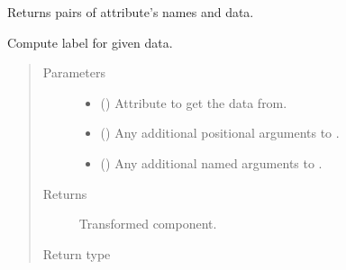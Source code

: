 \documentclass[letterpaper,10pt,english]{sphinxmanual}
\begin{document}
\begin{fulllineitems}
\begin{fulllineitems}
\end{fulllineitems}


\begin{fulllineitems}
\label{\detokenize{api/rock:geology.src.Rock.items}}
Returns pairs of attribute’s names and data.

\end{fulllineitems}


\begin{fulllineitems}
\label{\detokenize{api/rock:geology.src.Rock.label}}
Compute label for given data.
\begin{quote}\begin{description}
\item[{Parameters}] \leavevmode\begin{itemize}
\item {} 
 (\sphinxstyleliteralemphasis{\sphinxupquote{, }}) \textendash{} Attribute to get the data from.

\item {} 
 () \textendash{} Any additional positional arguments to .

\item {} 
 () \textendash{} Any additional named arguments to .

\end{itemize}

\item[{Returns}] \leavevmode
{} \textendash{} Transformed component.

\item[{Return type}] \leavevmode
{\hyperref[\detokenize{api/base_classes:geology.src.base_spatial.SpatialComponent}]{}}


\end{description}
\end{quote}
\end{fulllineitems}
\end{fulllineitems}
\end{document}
